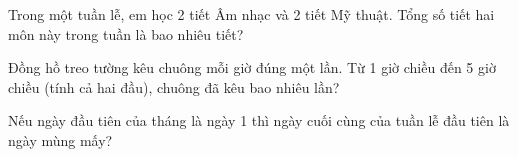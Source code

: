 \begin{ex} %
Trong một tuần lễ, em học 2 tiết Âm nhạc và 2 tiết Mỹ thuật. Tổng số tiết hai môn này trong tuần là bao nhiêu tiết?
\end{ex}

\begin{ex} %
Đồng hồ treo tường kêu chuông mỗi giờ đúng một lần. Từ 1 giờ chiều đến 5 giờ chiều (tính cả hai đầu), chuông đã kêu bao nhiêu lần?
\end{ex}

\begin{ex} %
Nếu ngày đầu tiên của tháng là ngày 1 thì ngày cuối cùng của tuần lễ đầu tiên là ngày mùng mấy?
\end{ex}
